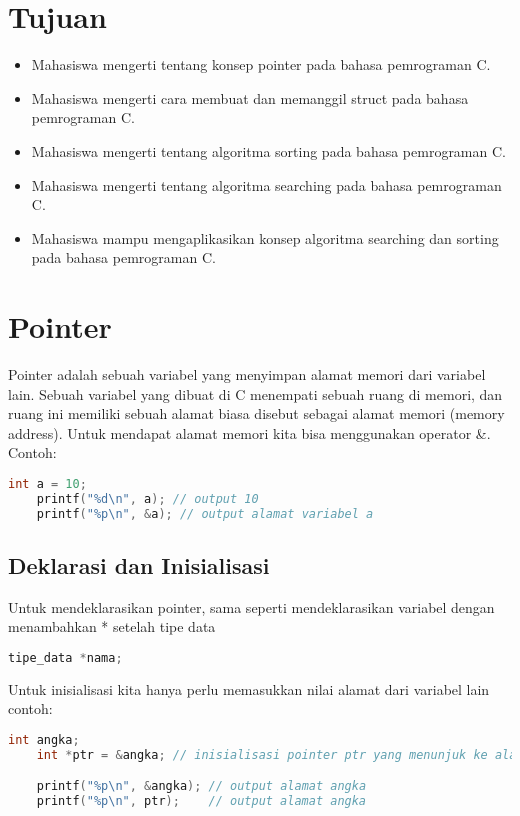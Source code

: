 \section*{Tujuan}
\begin{itemize}[label=$\bullet$, itemsep=-1pt, leftmargin=*]
    \item Mahasiswa mengerti tentang konsep pointer pada bahasa pemrograman C.
    \item Mahasiswa mengerti cara membuat dan memanggil struct pada bahasa pemrograman C.
    \item Mahasiswa mengerti tentang algoritma sorting pada bahasa pemrograman C.
    \item Mahasiswa mengerti tentang algoritma searching pada bahasa pemrograman C.
    \item Mahasiswa mampu mengaplikasikan konsep algoritma searching dan sorting pada bahasa pemrograman C.
\end{itemize}

\section{Pointer}

Pointer adalah sebuah variabel yang menyimpan alamat memori dari variabel lain.
Sebuah variabel yang dibuat di C menempati sebuah ruang di memori, dan ruang ini memiliki sebuah alamat biasa disebut sebagai alamat memori (memory address).
Untuk mendapat alamat memori kita bisa menggunakan operator \&. \\
Contoh:
\begin{lstlisting}[language=c]
	int a = 10;
	printf("%d\n", a); // output 10
	printf("%p\n", &a); // output alamat variabel a
\end{lstlisting}

\subsection{Deklarasi dan Inisialisasi}

Untuk mendeklarasikan pointer, sama seperti mendeklarasikan variabel dengan menambahkan * setelah tipe data
{
\captionsetup[lstlisting]{labelformat=empty, justification=raggedright, singlelinecheck=false} %
\begin{lstlisting}[language=c, caption={syntax}]
	tipe_data *nama;
\end{lstlisting}
}
Untuk inisialisasi kita hanya perlu memasukkan nilai alamat dari variabel lain
contoh:
\begin{lstlisting}[language=c]
	int angka;
	int *ptr = &angka; // inisialisasi pointer ptr yang menunjuk ke alamat variabel angka

	printf("%p\n", &angka); // output alamat angka
	printf("%p\n", ptr);    // output alamat angka
\end{lstlisting}

